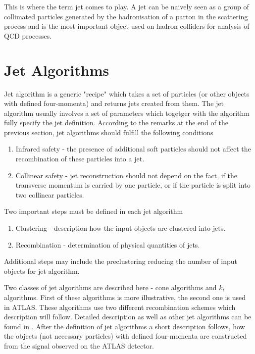 This is where the term jet comes to play. A jet can be naively seen as a group
of collimated particles generated by the hadronisation of a parton in the
scattering process and is the most important object used on hadron colliders for
analysis of QCD processes.

\section{Jet Algorithms}

Jet algorithm is a generic "recipe" which takes a set of particles (or other
objects with defined four-momenta) and returns jets created from them. The jet
algorithm usually involves a set of parameters which togetger with the algorithm fully specify
the jet definition. According to the remarks at the end of the previous section,
jet algorithms should fulfill the following conditions 

\begin{enumerate}
  \item Infrared safety - the presence of additional soft particles should not
    affect the recombination of these particles into a jet.
  \item Collinear safety - jet reconstruction should not depend on the fact, if
    the transverse momentum is carried by one particle, or if the particle is split
    into two collinear particles.
\end{enumerate}
Two important steps must be defined in each jet algorithm

\begin{enumerate}
  \item Clustering - description how the input objects are clustered into jets.
  \item Recombination - determination of physical quantities of jets.
\end{enumerate}
Additional steps may include the preclustering reducing the number of input
objects for jet algorithm.

Two classes of jet algorithms are described here - cone algorithms and $k_t$
algorithms. First of these algorithms is more illustrative, the second one is
used in ATLAS. These algorithms use two different recombination schemes which
description will follow.  Detailed description as well as other jet algorithms
can be found in \cite{ATLASmain,JetDoporuceniZdenek}. After the definition of jet
algorithms a short description follows, how the objects (not necessary particles)
with defined four-momenta are constructed from the signal observed on the ATLAS
detector.

